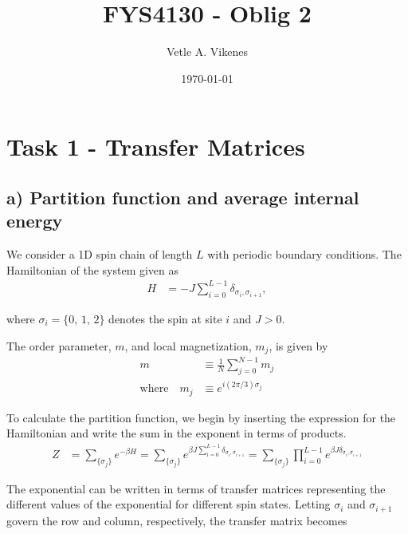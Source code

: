 \documentclass[reprint,english,notitlepage,aps,nobalancelastpage,nofootinbib]{revtex4-1}
\makeatletter
\renewcommand\onecolumngrid{%
\do@columngrid{one}{\@ne}%
\def\set@footnotewidth{\onecolumngrid}%
\def\footnoterule{\kern-6pt\hrule width 1.5in\kern6pt}%
}
\newcommand{\sumstate}{\sum_{\{\sigma_j\}}}
\makeatother
\begin{document}
\begin{center}
\title{\Huge FYS4130 - Oblig 2}
\author{\large Vetle A. Vikenes}
\date{\today}
\noaffiliation


\maketitle
\end{center}


\onecolumngrid


\section*{\large Task 1 - Transfer Matrices}

\subsection*{a) Partition function and average internal energy}

We consider a 1D spin chain of length $L$ with periodic boundary conditions. The Hamiltonian of the system given as  
\begin{align} \label{eq:Hamiltonian}
	H &= -J \sum_{i=0}^{L-1} \delta_{\sigma_i,\sigma_{i+1}},
\end{align}

where $\sigma_i=\{0,\,1,\,2\}$ denotes the spin at site $i$ and $J>0$.    

The order parameter, $m$, and local magnetization, $m_j$, is given by
\begin{align}
	m &\equiv \frac{1}{N} \sum_{j=0}^{N-1} m_j \label{eq:order parameter}  \\ 
	\text{where}\quad m_j &\equiv e^{i(2\pi/3)\sigma_j} \label{eq:magnetization}
\end{align}

To calculate the partition function, we begin by inserting the expression for the Hamiltonian and write the sum in the exponent in terms of products. 
\begin{align*}
	Z &= \sum_{\{\sigma_j\}} e^{-\beta H} = \sumstate e^{\beta J \sum_{i=0}^{L-1} \delta_{\sigma_i,\sigma_{i+1}}} = \sumstate \prod_{i=0}^{L-1} e^{\beta J \delta_{\sigma_i,\sigma_{i+1}}}
\end{align*}

The exponential can be written in terms of transfer matrices representing the different values of the exponential for different spin states. Letting $\sigma_i$ and $\sigma_{i+1}$ govern the row and column, respectively, the transfer matrix becomes 
\end{document}
